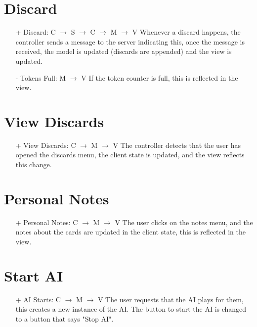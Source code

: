 \documentclass[12pt]{article}
\begin{document}
\section{Discard}

\begin{itemize}
\item[+] Discard: C $\rightarrow$ S $\rightarrow$ C $\rightarrow$ M $\rightarrow$ V \newline
Whenever a discard happens, the controller sends a message to the server indicating
this, once the message is received, the model is updated (discards are appended)
and the view is updated.

\item [-] Tokens Full: M $\rightarrow$ V \newline
If the token counter is full, this is reflected in the view.
\end{itemize}

\section{View Discards}

\begin{itemize}
\item[+] View Discards: C $\rightarrow$ M $\rightarrow$ V \newline
The controller detects that the user has opened the discards menu, the client state
is updated, and the view reflects this change.

\end{itemize}

\section{Personal Notes}

\begin{itemize}
\item[+] Personal Notes: C $\rightarrow$ M $\rightarrow$ V \newline
The user clicks on the notes menu, and the notes about the cards are updated in 
the client state, this is reflected in the view.

\end{itemize}

\section{Start AI}

\begin{itemize}
\item[+] AI Starts: C $\rightarrow$ M $\rightarrow$ V \newline
The user requests that the AI plays for them, this creates a new instance of the AI. The button to start the AI is changed to a button that says "Stop AI".

\end{itemize}
\end{document}
